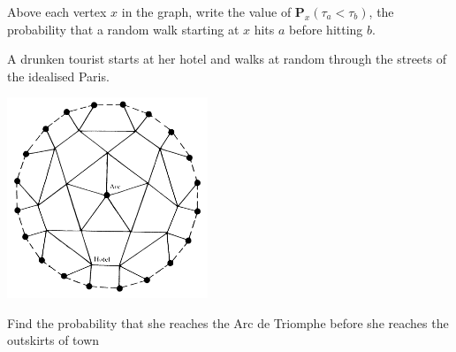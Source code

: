 \documentclass[11pt,fleqn]{book} %
\begin{document}
\begin{problem}
\begin{center}
\begin{tikzpicture}
 \end{tikzpicture}
 \end{center} 
 Above each vertex $x$ in the graph, write the value of $\mathbf{P}_x(\tau_a < \tau_b)$, the probability that a random walk starting at $x$ hits $a$ before hitting $b$.
\end{problem}


\begin{problem}
    A drunken tourist starts at her hotel and walks at random through the streets of the idealised Paris.
    \begin{center}
    \includegraphics[height = 6cm]{paris.png}
    \end{center}
    Find the probability that she reaches the Arc de Triomphe before she reaches the outskirts of town
\end{problem}
\end{document}
